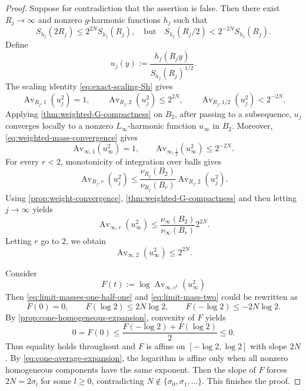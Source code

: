 \documentclass[12pt]{amsart}
\theoremstyle{plain}
\theoremstyle{definition}
\theoremstyle{remark}     %
\numberwithin{equation}{section}
\begin{document}
\begin{proof}
Suppose for contradiction that the assertion is false.  Then there exist $R_j\to\infty$ and
nonzero $g$-harmonic functions $h_j$ such that
\[
    S_{h_j}(2R_j)\leq2^{2N}S_{h_j}(R_j),\quad
    \text{but}\quad
    S_{h_j}(R_j/2)<2^{-2N}S_{h_j}(R_j).
\]
Define
\[
    u_j(y):=\frac{h_j(R_jy)}{S_{h_j}(R_j)^{1/2}}.
\]
The scaling identity \cref{eq:exact-scaling-Sh} gives
\[
    \operatorname{Av}_{R_j,1}(u_j^2)=1,
    \qquad
    \operatorname{Av}_{R_j,2}(u_j^2)\leq2^{2N},
    \qquad
    \operatorname{Av}_{R_j,1/2}(u_j^2)<2^{-2N}.
\]
Applying \cref{thm:weighted-G-compactness} on $B_2$,  after passing to
a subsequence, $u_j$ converges locally to a nonzero $L_\infty$-harmonic
function $u_\infty$ in $B_2$. 
Moreover, \cref{eq:weighted-mass-convergence} gives
\begin{equation}\label{eq:limit-masses-one-half-one}
    \mathrm{Av}_{\infty,1}(u_\infty^2)=1,
    \qquad
    \mathrm{Av}_{\infty,\frac{1}{2}}(u_\infty^2)
    \leq2^{-2N}.
\end{equation}
For every $r<2$, monotonicity of integration over balls gives
\[
    \operatorname{Av}_{R_j,r}(u_j^2)
    \leq
    \frac{\nu_{R_j}(B_2)}{\nu_{R_j}(B_r)}
    \operatorname{Av}_{R_j,2}(u_j^2).
\]
Using \cref{prop:weight-convergence}, \cref{thm:weighted-G-compactness} and then letting
$j\to\infty$ yields
\[
   \operatorname{Av}_{\infty,r}(u_{\infty}^2)
    \leq
    \frac{\nu_\infty(B_2)}{\nu_\infty(B_r)}2^{2N}.
\]
Letting $r$ go to $2$, we obtain
\begin{equation}\label{eq:limit-mass-two}
    \operatorname{Av}_{\infty,2}(u_{\infty}^2)
    \leq2^{2N}.
\end{equation}

Consider
\[
    F(t):=\log \operatorname{Av}_{\infty, e^t}(u_\infty^2)
\]
Then
\cref{eq:limit-masses-one-half-one} and \cref{eq:limit-mass-two} could be rewritten as
\[
    F(0)=0,
    \qquad
    F(\log 2)\leq2N\log 2,
    \qquad
    F(-\log 2)\leq-2N\log 2.
\]
By \cref{prop:cone-homogeneous-expansion}, convexity of $F$ yields
\[
    0=F(0)
    \leq\frac{F(-\log 2)+F(\log 2)}2
    \leq0.
\]
Thus equality holds throughout and $F$ is affine on
$[-\log 2,\log 2]$ with slope $2N$.  By
\cref{eq:cone-average-expansion}, the logarithm is affine only when all
nonzero homogeneous components have the same exponent. Then the slope of $F$ forces $2N=2\sigma_l$ for some $l\geq 0$, contradicting
$N\notin\{\sigma_0,\sigma_1,\ldots\}$. 
This finishes the proof.
\end{proof}
\end{document}
